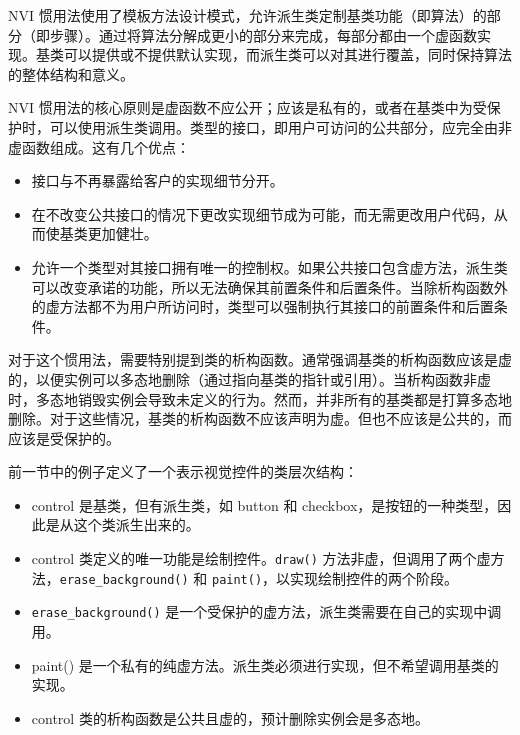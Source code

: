 
NVI 惯用法使用了模板方法设计模式，允许派生类定制基类功能（即算法）的部分（即步骤）。通过将算法分解成更小的部分来完成，每部分都由一个虚函数实现。基类可以提供或不提供默认实现，而派生类可以对其进行覆盖，同时保持算法的整体结构和意义。

NVI 惯用法的核心原则是虚函数不应公开；应该是私有的，或者在基类中为受保护时，可以使用派生类调用。类型的接口，即用户可访问的公共部分，应完全由非虚函数组成。这有几个优点：

\begin{itemize}
\item
接口与不再暴露给客户的实现细节分开。

\item
在不改变公共接口的情况下更改实现细节成为可能，而无需更改用户代码，从而使基类更加健壮。

\item
允许一个类型对其接口拥有唯一的控制权。如果公共接口包含虚方法，派生类可以改变承诺的功能，所以无法确保其前置条件和后置条件。当除析构函数外的虚方法都不为用户所访问时，类型可以强制执行其接口的前置条件和后置条件。
\end{itemize}

\begin{myNotic}
对于这个惯用法，需要特别提到类的析构函数。通常强调基类的析构函数应该是虚的，以便实例可以多态地删除（通过指向基类的指针或引用）。当析构函数非虚时，多态地销毁实例会导致未定义的行为。然而，并非所有的基类都是打算多态地删除。对于这些情况，基类的析构函数不应该声明为虚。但也不应该是公共的，而应该是受保护的。
\end{myNotic}

前一节中的例子定义了一个表示视觉控件的类层次结构：

\begin{itemize}
\item
control 是基类，但有派生类，如 button 和 checkbox，是按钮的一种类型，因此是从这个类派生出来的。

\item
control 类定义的唯一功能是绘制控件。\verb|draw()| 方法非虚，但调用了两个虚方法，\verb|erase_background()| 和 \verb|paint()|，以实现绘制控件的两个阶段。

\item
\verb|erase_background()| 是一个受保护的虚方法，派生类需要在自己的实现中调用。

\item
paint() 是一个私有的纯虚方法。派生类必须进行实现，但不希望调用基类的实现。

\item
control 类的析构函数是公共且虚的，预计删除实例会是多态地。
\end{itemize}

